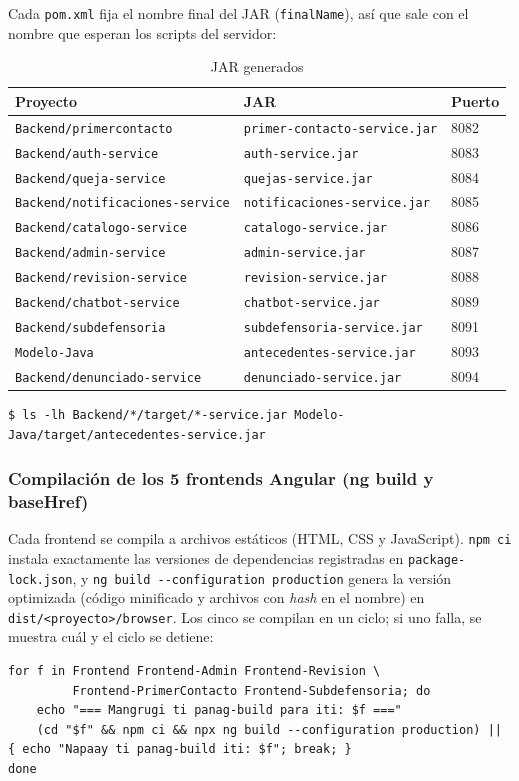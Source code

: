 Cada \texttt{pom.xml} fija el nombre final del JAR (\texttt{finalName}), así que sale con el nombre que esperan los scripts del servidor:
\begin{table}[H]
\centering
\caption{JAR generados}
\small
\begin{tabular}{lll}
\toprule
\textbf{Proyecto} & \textbf{JAR} & \textbf{Puerto} \\
\midrule
\texttt{Backend/primercontacto} & \texttt{primer-contacto-service.jar} & 8082 \\
\texttt{Backend/auth-service} & \texttt{auth-service.jar} & 8083 \\
\texttt{Backend/queja-service} & \texttt{quejas-service.jar} & 8084 \\
\texttt{Backend/notificaciones-service} & \texttt{notificaciones-service.jar} & 8085 \\
\texttt{Backend/catalogo-service} & \texttt{catalogo-service.jar} & 8086 \\
\texttt{Backend/admin-service} & \texttt{admin-service.jar} & 8087 \\
\texttt{Backend/revision-service} & \texttt{revision-service.jar} & 8088 \\
\texttt{Backend/chatbot-service} & \texttt{chatbot-service.jar} & 8089 \\
\texttt{Backend/subdefensoria} & \texttt{subdefensoria-service.jar} & 8091 \\
\texttt{Modelo-Java} & \texttt{antecedentes-service.jar} & 8093 \\
\texttt{Backend/denunciado-service} & \texttt{denunciado-service.jar} & 8094 \\
\bottomrule
\end{tabular}
\end{table}
\begin{lstlisting}
$ ls -lh Backend/*/target/*-service.jar Modelo-Java/target/antecedentes-service.jar
\end{lstlisting}

\subsubsection{Compilación de los 5 frontends Angular (ng build y baseHref)}
Cada frontend se compila a archivos estáticos (HTML, CSS y JavaScript). \texttt{npm ci} instala exactamente las versiones de dependencias registradas en \texttt{package-lock.json}, y \texttt{ng build -{}-configuration production} genera la versión optimizada (código minificado y archivos con \emph{hash} en el nombre) en \texttt{dist/<proyecto>/browser}.
Los cinco se compilan en un ciclo; si uno falla, se muestra cuál y el ciclo se detiene:
\begin{lstlisting}
for f in Frontend Frontend-Admin Frontend-Revision \
         Frontend-PrimerContacto Frontend-Subdefensoria; do
    echo "=== Mangrugi ti panag-build para iti: $f ==="
    (cd "$f" && npm ci && npx ng build --configuration production) || { echo "Napaay ti panag-build iti: $f"; break; }
done
\end{lstlisting}

